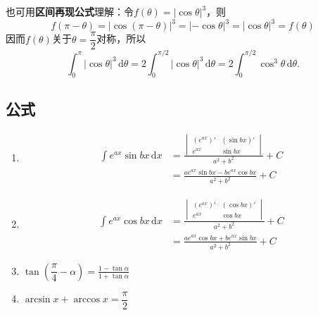 \documentclass[../book.tex]{subfiles}
\begin{document}
\begin{enumerate}
        也可用\textbf{区间再现公式}理解：令$f(\theta) = |\cos\theta|^3$，则
        \[
            f(\pi - \theta) = |\cos(\pi - \theta)|^3 = |-\cos\theta|^3 = |\cos\theta|^3 = f(\theta)
        \]
        因而$f(\theta)$关于$\theta = \dfrac{\pi}{2}$对称，所以
        \[
            \int_0^{\pi} |\cos \theta|^3\,\mathrm{d}\theta
            = 2\int_0^{\pi/2} |\cos \theta|^3\,\mathrm{d}\theta
            = 2\int_0^{\pi/2} \cos^3\theta\,\mathrm{d}\theta.
        \]


    \end{enumerate}

    \subsection{公式}

    \begin{enumerate}
        \item
        \[
            \begin{aligned}
                \int e^{ax} \sin bx \,\mathrm{d}x
                &=
                \frac{
                    \begin{vmatrix}
                        (e^{ax})' & (\sin bx)' \\
                        e^{ax} & \sin bx
                    \end{vmatrix}
                }{a^2 + b^2}
                + C  \\[6pt]
                &=
                \frac{a e^{ax} \sin bx - b e^{ax} \cos bx}{a^2 + b^2}
                + C
            \end{aligned}
        \]

        \item
        \[
            \begin{aligned}
                \int e^{ax} \cos bx \,\mathrm{d}x
                &=
                \frac{
                    \begin{vmatrix}
                        (e^{ax})' & (\cos bx)' \\
                        e^{ax} & \cos bx
                    \end{vmatrix}
                }{a^2 + b^2}
                + C \\[6pt]
                &=
                \frac{a e^{ax} \cos bx + b e^{ax} \sin bx}{a^2 + b^2}
                + C
            \end{aligned}
        \]
        \item $\tan (\dfrac{\pi}{4} - \alpha) = \displaystyle\frac{1 - \tan \alpha}{1 + \tan \alpha}$
        \item $\arcsin x + \arccos x = \dfrac{\pi}{2}$

    \end{enumerate}
\end{document}
